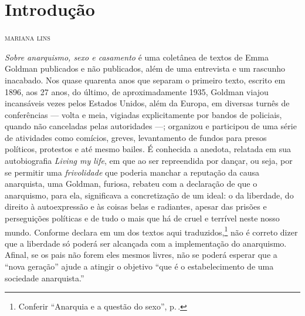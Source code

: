 \newcommand{\subtitulo}[1]{\NoCaseChange{\textnormal{\break\Large\itshape#1}}}
\chapter*{Introdução\smallskip\subtitulo{A \textit{suma sacerdotisa} do anarquismo}}


\begin{flushright}
\textsc{mariana lins}
\end{flushright}\bigskip

\noindent\textit{Sobre anarquismo, sexo e casamento} é uma coletânea de
textos de Emma Goldman publicados e não publicados, além de uma entrevista e um rascunho
inacabado. Nos quase quarenta anos que separam o primeiro texto, escrito em 1896, 
aos 27 anos, do último, de
aproximadamente 1935, Goldman viajou incansáveis vezes pelos Estados
Unidos, além da Europa, em diversas turnês de conferências --- volta e
meia, vigiadas explicitamente por bandos de policiais, quando não
canceladas pelas autoridades ---; organizou e participou de uma série de
atividades como comícios, greves, levantamento de fundos para presos
políticos, protestos e até mesmo bailes. É conhecida a anedota, relatada
em sua autobiografia \textit{Living my life}, em que ao ser repreendida
por dançar, ou seja, por se permitir uma \textit{frivolidade} que poderia
manchar a reputação da causa anarquista, uma Goldman, furiosa, rebateu
com a declaração de que o anarquismo, para ela, significava a
concretização de um ideal: o da liberdade, do direito à
autoexpressão e às coisas belas e radiantes, apesar das prisões e
perseguições políticas e de tudo o mais que há de cruel e terrível neste
nosso mundo. Conforme declara em um dos textos aqui traduzidos,\footnote{Conferir 
``Anarquia e a questão do sexo'', p.\,\pageref{ref1}.}
não é correto dizer que a
liberdade só poderá ser alcançada com a implementação do anarquismo.
Afinal, se os pais não forem eles mesmos livres, não se poderá esperar
que a ``nova geração'' ajude a atingir o objetivo ``que é o
estabelecimento de uma sociedade anarquista.''

